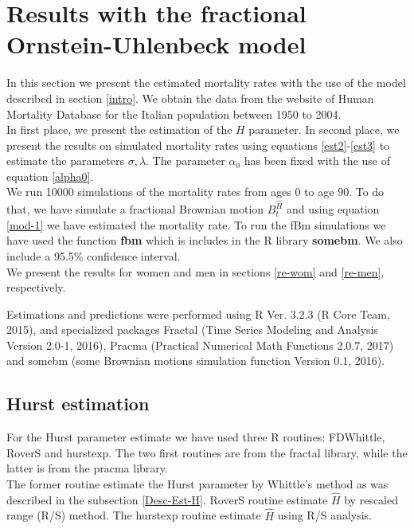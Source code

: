 \documentclass[smallextended]{svjour3}
\begin{document}
\section{Results with the fractional Ornstein-Uhlenbeck model}
\label{re-fou}

In this section we present the estimated mortality rates with the use of the
model
described in section \ref{intro}. We obtain the data from the website of Human
Mortality Database for the Italian population between 1950 to 2004.\\

In first place, we present the estimation of the $H$ parameter. In second
place, we present the results on simulated mortality rates using  equations
\eqref{est2}-\eqref{est3} to estimate the parameters $\sigma,\lambda$. The
parameter $\alpha_0$ has been fixed with the use of equation \eqref{alpha0}.\\

We run 10000 simulations of the mortality rates from ages $0$ to age $90$. To
do that, we have simulate a fractional Brownian motion $B_t^{\hat H}$ and using
equation \eqref{mod-1} we have estimated the mortality rate. To run the fBm
simulations we have used the function {\bf fbm} which is includes in the R
library {\bf somebm}.  We also include a  95.5\% confidence interval.\\


We present the results for women and men in sections \ref{re-wom} and
\ref{re-men}, respectively.

Estimations and predictions were performed using R Ver. 3.2.3 (R Core Team,
2015), and specialized packages
Fractal (Time Series Modeling and Analysis
Version 2.0-1, 2016), Pracma (Practical Numerical Math Functions 2.0.7, 2017)
and somebm (some Brownian motions simulation function Version 0.1, 2016).


\subsection{Hurst estimation}\label{hu-est}

For the Hurst parameter estimate we have used three R routines: FDWhittle,
RoverS and hurstexp.
The two first routines are from the fractal library, while the latter is from
the pracma library.\\

The former routine estimate the Hurst parameter by Whittle's method as was
described in the subsection \ref{Desc-Est-H}. RoverS routine
estimate $\hat H $ by rescaled range (R/S) method. The hurstexp routine
estimate $\hat H $  using
R/S analysis. \\
\end{document}
